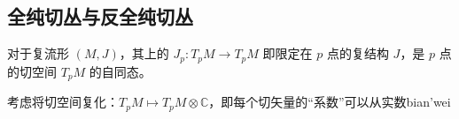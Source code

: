 

\subsection{全纯切丛与反全纯切丛}
对于复流形 $(M, J)$，其上的 $J_p: T_p M \to T_p M$ 即限定在 $p$ 点的复结构 $J$，是 $p$ 点的切空间 $T_p M$ 的自同态。

考虑将切空间复化：$T_p M \mapsto T_p M \otimes \mathbb C$，即每个切矢量的“系数”可以从实数bian'wei
